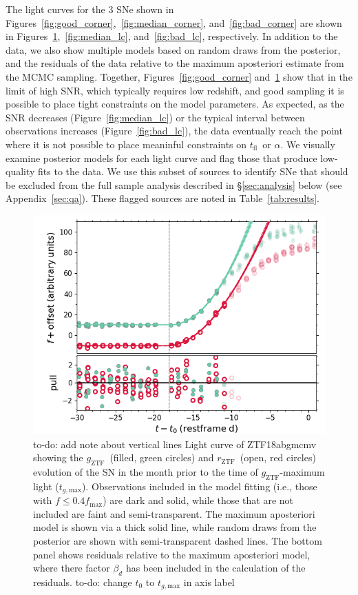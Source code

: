 \documentclass[twocolumn]{aastex63}
\newcommand{\todo}[1]{{\color{magenta} to-do: {#1}}}
\newcommand{\rztf}{$r_\mathrm{ZTF}$}
\newcommand{\gztf}{$g_\mathrm{ZTF}$}
\newcommand{\tfl}{$t_\mathrm{fl}$}
\begin{document}
The light curves for the 3 SNe shown in
Figures~\ref{fig:good_corner},~\ref{fig:median_corner},
and~\ref{fig:bad_corner} are shown in
Figures~\ref{fig:good_lc},~\ref{fig:median_lc}, and~\ref{fig:bad_lc},
respectively. In addition to the data, we also show multiple models based on
random draws from the posterior, and the residuals of the data relative to
the maximum aposteriori estimate from the MCMC sampling. Together,
Figures~\ref{fig:good_corner} and~\ref{fig:good_lc} show that in the limit of
high SNR, which typically requires low redshift, and good sampling it is
possible to place tight constraints on the model parameters. As expected, as
the SNR decreases (Figure~\ref{fig:median_lc}) or the typical interval
between observations increases (Figure~\ref{fig:bad_lc}), the data eventually
reach the point where it is not possible to place meaninful constraints on
\tfl\ or $\alpha$. We visually examine posterior models for each light curve
and flag those that produce low-quality fits to the data. We use this subset
of sources to identify SNe that should be excluded from the full sample
analysis described in \S\ref{sec:analysis} below (see Appendix~\ref{sec:qa}).
These flagged sources are noted in Table~\ref{tab:results}.

\begin{figure}
    \centering
    \includegraphics[width=1\linewidth]{./figures/ZTF18abgmcmv_model_lc.png}
    \caption{\todo{add note about vertical lines} Light curve of ZTF18abgmcmv
    showing the \gztf\ (filled, green circles) and \rztf\ (open, red circles)
    evolution of the SN in the month prior to the time of \gztf-maximum light
    ($t_{g, \mathrm{max}}$). Observations included in the model fitting
    (i.e., those with $f \le 0.4 f_\mathrm{max}$) are dark and solid, while
    those that are not included are faint and semi-transparent. The maximum
    aposteriori model is shown via a thick solid line, while random draws
    from the posterior are shown with semi-transparent dashed lines. The
    bottom panel shows residuals relative to the maximum aposteriori model,
    where there factor $\beta_d$ has been included in the calculation of the
    residuals. \todo{change $t_0$ to $t_{g, \mathrm{max}}$ in axis label}}
    \label{fig:good_lc}
\end{figure}
\end{document}
